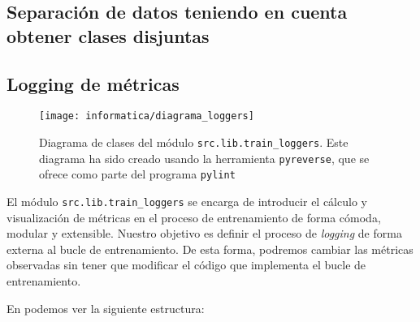 


\subsection{Separación de datos teniendo en cuenta obtener clases disjuntas}

\subsection{Logging de métricas} \label{isec:loggin_metricas}

\begin{figure}[H]
    \centering
    \texttt{[image: informatica/diagrama\_loggers]}
    \caption{Diagrama de clases del módulo \lstinline{src.lib.train_loggers}. Este diagrama ha sido creado usando la herramienta \lstinline{pyreverse}, que se ofrece como parte del programa \lstinline{pylint}}
    \label{img:diagrama_clases_loggers}
\end{figure}

El módulo \lstinline{src.lib.train_loggers} se encarga de introducir el cálculo y visualización de métricas en el proceso de entrenamiento de forma cómoda, modular y extensible. Nuestro objetivo es definir el proceso de \textit{logging} de forma externa al bucle de entrenamiento. De esta forma, podremos cambiar las métricas observadas sin tener que modificar el código que implementa el bucle de entrenamiento.

En  podemos ver la siguiente estructura:

